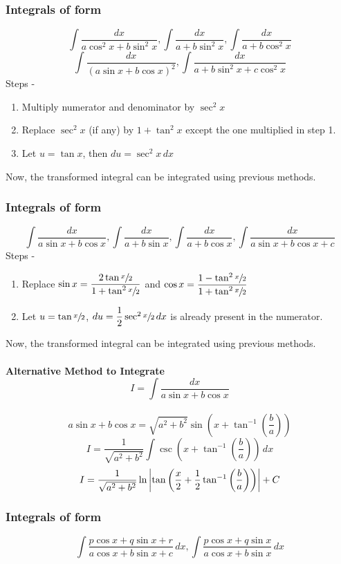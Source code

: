 \documentclass{article}
\begin{document}
\subsubsection{Integrals of form}
$$\int \dfrac{dx}{a \cos^2 x+b\sin ^2 x}, \int \dfrac{dx}{a+b \sin^2 x}, \int \dfrac{dx}{a+b\cos^2 x}$$
$$\int \dfrac{dx}{\left(a\sin x+b\cos x\right)^2}, \int \dfrac{dx}{a+b\sin^2 x+c \cos ^2 x}$$
Steps -
\begin{enumerate}[1.]
    \item Multiply numerator and denominator by $\sec^2 x$
    \item Replace $\sec^2 x$ (if any) by $1+\tan^2 x$  except the one multiplied in step 1.
    \item Let $u=\tan x$, then $du=\sec^2 x \, dx$
\end{enumerate}
Now, the transformed integral can be integrated using previous methods.

\subsubsection{Integrals of form }
$$\int \dfrac{dx}{a\sin x +b \cos x}, \int \dfrac{dx}{a+b\sin x}, \int \dfrac{dx}{a+b\cos x}, \int \dfrac{dx}{a\sin x + b \cos x + c} $$
Steps -
\begin{enumerate}[1.]
    \item Replace $\sin x = \dfrac{2\tan \sfrac{x}{2}}{1+\tan^2 \sfrac{x}{2}}$ and $\cos x = \dfrac{1-\tan^2 \sfrac{x}{2}}{1+\tan^2 \sfrac{x}{2}}$
    \item Let $u=\tan \sfrac{x}{2}$, $du= \dfrac{1}{2} \sec^2 \sfrac{x}{2} \, dx$ is already present in the numerator.
\end{enumerate}
Now, the transformed integral can be integrated using previous methods.

\paragraph{Alternative Method to Integrate $$I=\int \dfrac{dx}{a\sin x + b \cos x}$$}

$$a\sin x + b \cos x = \sqrt{a^2+b^2} \sin (x+\tan^{-1} \left(\dfrac{b}{a}\right)) $$
$$I=\dfrac{1}{\sqrt{a^2+b^2}}\int \csc \left(x+ \tan^{-1}\left(\dfrac{b}{a}\right) \right) \, dx $$
$$I=\dfrac{1}{\sqrt{a^2+b^2}}\ln \abs{\tan \left(\dfrac{x}{2}+ \dfrac{1}{2} \tan^{-1} \left(\dfrac{b}{a}\right) \right)}+C$$
\subsubsection{Integrals of form }
$$\int \dfrac{p\cos x + q \sin x +r}{a \cos x + b \sin x + c} \, dx , \int \dfrac{p \cos x + q \sin x }{a \cos x + b \sin x} \, dx $$
\end{document}
